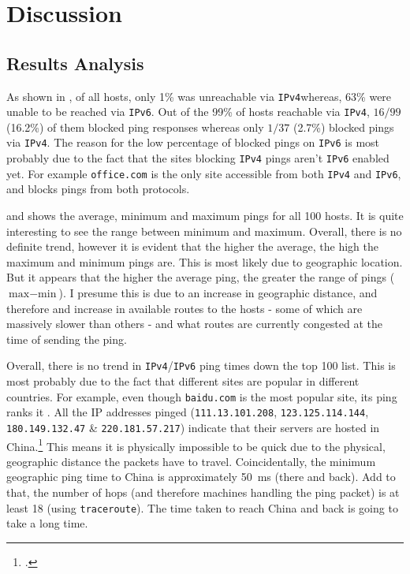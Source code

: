 \documentclass[a4paper]{article}
\def \IPF {\texttt{IPv4}}
\def \IPS {\texttt{IPv6}}
\begin{document}
\section{Discussion}
\subsection*{Results Analysis}

As shown in , of all hosts, only 1\% was unreachable via \IPF whereas, 63\% were unable to be reached via \IPS.
Out of the 99\% of hosts reachable via \IPF, $16/99$ (16.2\%) of them blocked ping responses whereas only $1/37$ (2.7\%) blocked pings via \IPF.
The reason for the low percentage of blocked pings on {\IPS} is most probably due to the fact that the sites blocking {\IPF} pings aren't {\IPS} enabled yet.
For example \texttt{office.com} is the only site accessible from both {\IPF} and {\IPS}, and blocks pings from both protocols.

 and  shows the average, minimum and maximum pings for all 100 hosts.
It is quite interesting to see the range between minimum and maximum.
Overall, there is no definite trend, however it is evident that the higher the average, the high the maximum and minimum pings are.
This is most likely due to geographic location.
But it appears that the higher the average ping, the greater the range of pings ($ \textrm{max} - \textrm{min}$).
I presume this is due to an increase in geographic distance, and therefore and increase in available routes to the hosts -
  some of which are massively slower than others - and what routes are currently congested at the time of sending the ping.

Overall, there is no trend in {\IPF}/{\IPS} ping times down the top 100 list.
This is most probably due to the fact that different sites are popular in different countries.
For example, even though \texttt{baidu.com} is the  most popular site, its ping ranks it .
All the IP addresses pinged (\texttt{111.13.101.208}, \texttt{123.125.114.144}, \texttt{180.149.132.47} \& \texttt{220.181.57.217})
  indicate that their servers are hosted in China.\footcite{ip_location}
This means it is physically impossible to be quick due to the physical, geographic distance the packets have to travel.
Coincidentally, the minimum geographic ping time to China is approximately \SI{50}{\milli\second} (there and back).
Add to that, the number of hops (and therefore machines handling the ping packet) is at least 18 (using \texttt{traceroute}).
The time taken to reach China and back is going to take a long time.
\end{document}
